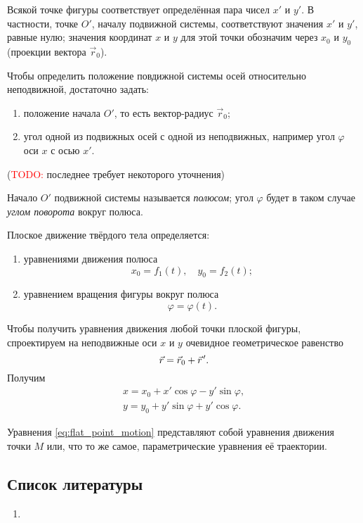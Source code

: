 Всякой точке фигуры соответствует определённая пара чисел $x'$ и $y'$. В
частности, точке $O'$, началу подвижной системы, соответствуют значения $x'$ и
$y'$, равные нулю; значения координат $x$ и $y$ для этой точки обозначим через
$x_0$ и $y_0$ (проекции вектора $\vec{r}_0$).

Чтобы определить положение повдижной системы осей относительно неподвижной,
достаточно задать:
\begin{enumerate}
  \item положение начала $O'$, то есть вектор-радиус $\vec{r}_0$;
  \item угол одной из подвижных осей с одной из неподвижных, например угол
    $\varphi$ оси $x$ с осью $x'$.
\end{enumerate}
(\textcolor{red}{TODO:} последнее требует некоторого уточнения)

\begin{definition}
  Начало $O'$ подвижной системы называется \textit{полюсом}; угол $\varphi$ будет в
  таком случае \textit{углом поворота} вокруг полюса.
\end{definition}

Плоское движение твёрдого тела определяется:
\begin{enumerate}
  \item уравнениями движения полюса
    \begin{equation}
      x_0 = f_1(t), \quad y_0 = f_2(t);
    \end{equation}
  \item уравнением вращения фигуры вокруг полюса
    \begin{equation}
      \varphi = \varphi(t).
    \end{equation}
\end{enumerate}

Чтобы получить уравнения движения любой точки плоской фигуры, спроектируем на
неподвижные оси $x$ и $y$ очевидное геометрическое равенство
\begin{equation*}
  \vec{r} = \vec{r}_0 + \pvec{r}.
\end{equation*}
Получим
\begin{equation}
  \label{eq:flat_point_motion}
  \begin{gathered}
    x = x_0 + x' \cos\varphi - y' \sin\varphi, \\
    y = y_0 + y' \sin\varphi + y' \cos\varphi.
  \end{gathered}
\end{equation}

Уравнения \ref{eq:flat_point_motion} представляют собой уравнения движения точки
$M$ или, что то же самое, параметрические уравнения её траектории.

\subsection{Список литературы}
\begin{enumerate}
  \item \cite{lourie}
\end{enumerate}

